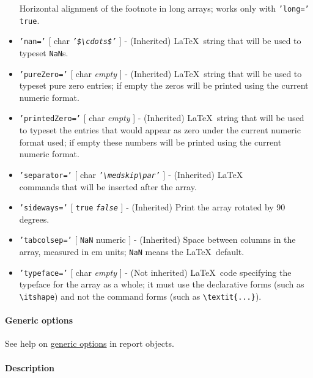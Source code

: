 \begin{itemize}
   Horizontal alignment of the footnote in long arrays; works only with
   \texttt{'long='} \texttt{true}.
 \item
   \texttt{'nan='} {[} char \textbar{}
   \emph{\texttt{'\$\textbackslash{}cdots\$'}} {]} - (Inherited)
   \LaTeX~string that will be used to typeset \texttt{NaN}s.
 \item
   \texttt{'pureZero='} {[} char \textbar{} \emph{empty} {]} -
   (Inherited) \LaTeX~string that will be used to typeset pure zero
   entries; if empty the zeros will be printed using the current numeric
   format.
 \item
   \texttt{'printedZero='} {[} char \textbar{} \emph{empty} {]} -
   (Inherited) \LaTeX~string that will be used to typeset the entries
   that would appear as zero under the current numeric format used; if
   empty these numbers will be printed using the current numeric format.
 \item
   \texttt{'separator='} {[} char \textbar{}
   \emph{\texttt{'\textbackslash{}medskip\textbackslash{}par'}} {]} -
   (Inherited) \LaTeX\\commands that will be inserted after the array.
 \item
   \texttt{'sideways='} {[} \texttt{true} \textbar{}
   \emph{\texttt{false}} {]} - (Inherited) Print the array rotated by 90
   degrees.
 \item
   \texttt{'tabcolsep='} {[} \texttt{NaN} \textbar{} numeric {]} -
   (Inherited) Space between columns in the array, measured in em units;
   \texttt{NaN} means the \LaTeX~default.
 \item
   \texttt{'typeface='} {[} char \textbar{} \emph{empty} {]} - (Not
   inherited) \LaTeX~code specifying the typeface for the array as a
   whole; it must use the declarative forms (such as
   \texttt{\textbackslash{}itshape}) and not the command forms (such as
   \texttt{\textbackslash{}textit\{...\}}).
 \end{itemize}
 
 \paragraph{Generic options}
 
 See help on \href{report/Contents}{generic options} in report objects.
 
 \paragraph{Description}
 
